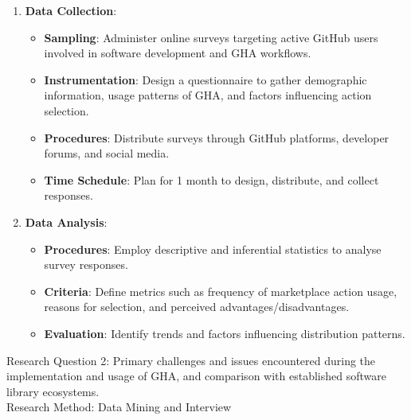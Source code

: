 \documentclass[conference]{IEEEtran}
\begin{document}
\begin{enumerate}
    \item \textbf{Data Collection}:\\
    \begin{itemize}
        \item \textbf{Sampling}: Administer online surveys targeting active GitHub users involved in software development and GHA workflows.
        \item \textbf{Instrumentation}: Design a questionnaire to gather demographic information, usage patterns of GHA, and factors influencing action selection.
        \item \textbf{Procedures}: Distribute surveys through GitHub platforms, developer forums, and social media.
        \item \textbf{Time Schedule}: Plan for 1 month to design, distribute, and collect responses.\\
    \end{itemize}
    
    \item \textbf{Data Analysis}:\\
    \begin{itemize}
        \item \textbf{Procedures}: Employ descriptive and inferential statistics to analyse survey responses.
        \item \textbf{Criteria}: Define metrics such as frequency of marketplace action usage, reasons for selection, and perceived advantages/disadvantages.
        \item \textbf{Evaluation}: Identify trends and factors influencing distribution patterns.\\
    \end{itemize}
\end{enumerate}

Research Question 2: Primary challenges and issues encountered during the implementation and usage of GHA, and comparison with established software library ecosystems.\\

Research Method: Data Mining and Interview\\
\end{document}
